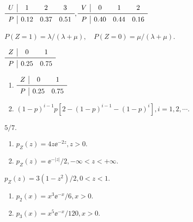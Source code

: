 \begin{answer}
  \item $\begin{array}{c|ccc}
    U & 1 & 2 & 3 \\
    \midrule
    P & 0.12 & 0.37 & 0.51
  \end{array},
  \begin{array}{c|ccc}
    V & 0 & 1 & 2 \\
    \midrule
    P & 0.40 & 0.44 & 0.16
  \end{array}$
  \item $P(Z=1)=\lambda/(\lambda+\mu),\quad P(Z=0)=\mu/(\lambda+\mu)$.
  \item $\begin{array}{c|cc}
    Z & 0 & 1 \\
    \midrule
    P & 0.25 & 0.75
  \end{array}$
  \item \begin{enumerate}
    \item $\begin{array}{c|cc}
      Z & 0 & 1 \\
      \midrule
      P & 0.25 & 0.75
    \end{array}$
    \item $(1-p)^{i-1}p[2-(1-p)^{i-1}-(1-p)^i],i=1,2,\cdots$.
  \end{enumerate}
    \item $5/7$.
    \item \begin{enumerate}
      \item $p_Z(z)=4z\ee^{-2z},z>0$.
      \item $p_Z(z)=\ee^{-|z|}/2,-\infty<z<+\infty$.
    \end{enumerate}
    \item $p_Z(z)=3(1-z^2)/2,0<z<1$.
    \item \begin{enumerate}
      \item $p_2(x)=x^3\ee^{-x}/6,x>0$.
      \item $p_3(x)=x^5\ee^{-x}/120,x>0$.
    \end{enumerate}
    \item {}
\end{answer}

